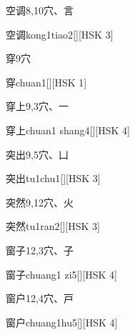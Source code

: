 \begin{entry}{空调}{8,10}{⽳、⾔}
  \begin{phonetics}{空调}{kong1tiao2}[][HSK 3]
  \end{phonetics}
\end{entry}

\begin{entry}{穿}{9}{⽳}
  \begin{phonetics}{穿}{chuan1}[][HSK 1]
  \end{phonetics}
\end{entry}

\begin{entry}{穿上}{9,3}{⽳、⼀}
  \begin{phonetics}{穿上}{chuan1 shang4}[][HSK 4]
  \end{phonetics}
\end{entry}

\begin{entry}{突出}{9,5}{⽳、⼐}
  \begin{phonetics}{突出}{tu1chu1}[][HSK 3]
  \end{phonetics}
\end{entry}

\begin{entry}{突然}{9,12}{⽳、⽕}
  \begin{phonetics}{突然}{tu1ran2}[][HSK 3]
  \end{phonetics}
\end{entry}

\begin{entry}{窗子}{12,3}{⽳、⼦}
  \begin{phonetics}{窗子}{chuang1 zi5}[][HSK 4]
  \end{phonetics}
\end{entry}

\begin{entry}{窗户}{12,4}{⽳、⼾}
  \begin{phonetics}{窗户}{chuang1hu5}[][HSK 4]
  \end{phonetics}
\end{entry}

